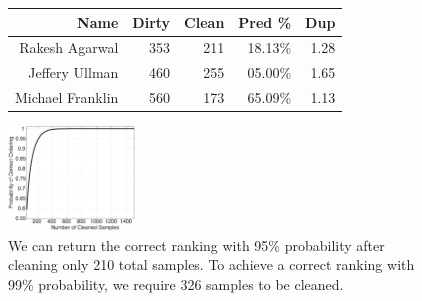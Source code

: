 \begin{figure}
\centering
\begin{tabular}{r r r r r}
\hline\hline
Name & Dirty & Clean & Pred \% & Dup \\ 
\hline  %
Rakesh Agarwal & 353 & 211 & 18.13\% & 1.28\\
\hline
Jeffery Ullman & 460 & 255 & 05.00\% & 1.65\\
\hline
Michael Franklin & 560 & 173 & 65.09\% & 1.13\\
\hline
\end{tabular}
\qquad
\includegraphics[width=0.3\textwidth]{figs/msacademic-paper-ranking.eps}

\caption{We can return the correct ranking with 95\% probability after cleaning only 210 total samples. To achieve a correct ranking with 99\% probability, we require 326 samples to be cleaned.\label{exp:ms-academic-ranking}}

\end{figure}


